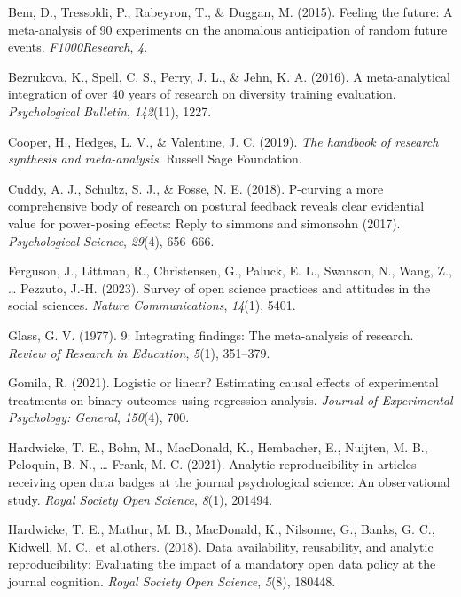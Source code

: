 \documentclass[
  man]{apa6}
\newlength{\cslhangindent}
\newenvironment{CSLReferences}[2] %
 {\begin{list}{}{%
  \setlength{\itemindent}{0pt}
  \setlength{\leftmargin}{0pt}
  \setlength{\parsep}{0pt}
  \ifodd #1
   \setlength{\leftmargin}{\cslhangindent}
   \setlength{\itemindent}{-1\cslhangindent}
  \fi
  \setlength{\itemsep}{#2\baselineskip}}}
 {\end{list}}
\begin{document}
\label{refs}
\begin{CSLReferences}{1}{0}
Bem, D., Tressoldi, P., Rabeyron, T., \& Duggan, M. (2015). Feeling the future: A meta-analysis of 90 experiments on the anomalous anticipation of random future events. \emph{F1000Research}, \emph{4}.

Bezrukova, K., Spell, C. S., Perry, J. L., \& Jehn, K. A. (2016). A meta-analytical integration of over 40 years of research on diversity training evaluation. \emph{Psychological Bulletin}, \emph{142}(11), 1227.

Cooper, H., Hedges, L. V., \& Valentine, J. C. (2019). \emph{The handbook of research synthesis and meta-analysis}. Russell Sage Foundation.

Cuddy, A. J., Schultz, S. J., \& Fosse, N. E. (2018). P-curving a more comprehensive body of research on postural feedback reveals clear evidential value for power-posing effects: Reply to simmons and simonsohn (2017). \emph{Psychological Science}, \emph{29}(4), 656--666.

Ferguson, J., Littman, R., Christensen, G., Paluck, E. L., Swanson, N., Wang, Z., \ldots{} Pezzuto, J.-H. (2023). Survey of open science practices and attitudes in the social sciences. \emph{Nature Communications}, \emph{14}(1), 5401.

Glass, G. V. (1977). 9: Integrating findings: The meta-analysis of research. \emph{Review of Research in Education}, \emph{5}(1), 351--379.

Gomila, R. (2021). Logistic or linear? Estimating causal effects of experimental treatments on binary outcomes using regression analysis. \emph{Journal of Experimental Psychology: General}, \emph{150}(4), 700.

Hardwicke, T. E., Bohn, M., MacDonald, K., Hembacher, E., Nuijten, M. B., Peloquin, B. N., \ldots{} Frank, M. C. (2021). Analytic reproducibility in articles receiving open data badges at the journal psychological science: An observational study. \emph{Royal Society Open Science}, \emph{8}(1), 201494.

Hardwicke, T. E., Mathur, M. B., MacDonald, K., Nilsonne, G., Banks, G. C., Kidwell, M. C., et al.others. (2018). Data availability, reusability, and analytic reproducibility: Evaluating the impact of a mandatory open data policy at the journal cognition. \emph{Royal Society Open Science}, \emph{5}(8), 180448.


\end{CSLReferences}
\end{document}
